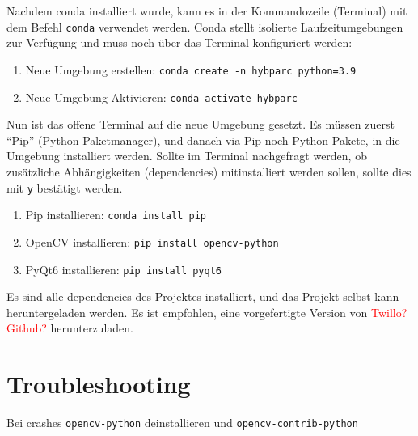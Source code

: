 \documentclass[a4paper]{article}
\newcommand{\warn}[1]{\textcolor{red}{#1}}
\newcommand{\code}[1]{\texttt{#1}}
\begin{document}
Nachdem conda installiert wurde, kann es in der Kommandozeile (Terminal) mit dem Befehl \code{conda} verwendet werden. Conda stellt isolierte Laufzeitumgebungen zur Verfügung und muss noch über das Terminal konfiguriert werden:
\begin{enumerate}
    \item Neue Umgebung erstellen: \code{conda create -n hybparc python=3.9}
    \item Neue Umgebung Aktivieren: \code{conda activate hybparc}
\end{enumerate}

Nun ist das offene Terminal auf die neue Umgebung gesetzt. Es müssen zuerst \enquote{Pip} (Python Paketmanager), und danach via Pip noch Python Pakete, in die Umgebung installiert werden. Sollte im Terminal nachgefragt werden, ob zusätzliche Abhängigkeiten (dependencies) mitinstalliert werden sollen, sollte dies mit \code{y} bestätigt werden.

\begin{enumerate}
    \item Pip installieren: \code{conda install pip}
    \item OpenCV installieren: \code{pip install opencv-python}
    \item PyQt6 installieren: \code{pip install pyqt6}
\end{enumerate}

Es sind alle dependencies des Projektes installiert, und das Projekt selbst kann heruntergeladen werden. Es ist empfohlen, eine vorgefertigte Version von \warn{Twillo? Github?} herunterzuladen.

\section{Troubleshooting}
\label{sec:troubleshooting}
Bei crashes \code{opencv-python} deinstallieren und \code{opencv-contrib-python} 
\end{document}
